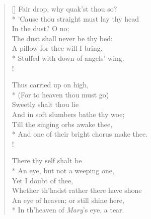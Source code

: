 \documentclass[MAIN]{subfiles}
\begin{document}
\begin{verse}[\versewidth]
\vin Fair drop, why quak'st thou so?\\*
'Cause thou straight must lay thy head\\
\vin In the dust? O no;\\
The dust shall never be thy bed:\\
A pillow for thee will I bring,\\*
Stuffed with down of angels' wing.\\!

\vin Thus carried up on high,\\*
(For to heaven thou must go)\\ 
\vin Sweetly shalt thou lie\\
And in soft slumbers bathe thy woe;\\
Till the singing orbs awake thee,\\*
And one of their bright chorus make thee.\\!

\vin There thy self shalt be\\*
An eye, but not a weeping one,\\
\vin Yet I doubt of thee,\\
Whether th'hadst rather there have shone\\
An eye of heaven; or still shine here,\\*
In th'heaven of \emph{Mary}'s eye, a tear.
\end{verse}
\end{document}
